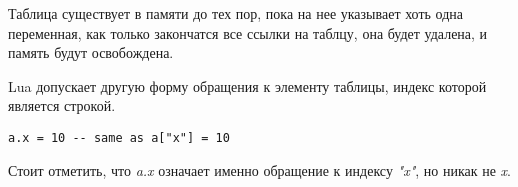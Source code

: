 Таблица существует в памяти до тех пор, пока на нее указывает хоть одна переменная, как только закончатся все ссылки на таблцу, она будет удалена, и память будут освобождена.

Lua допускает другую форму обращения к элементу таблицы, индекс которой является строкой. 

\begin{lstlisting}
a.x = 10 -- same as a["x"] = 10
\end{lstlisting}

Стоит отметить, что \emph{a.x} означает именно обращение к индексу \emph{"x"}, но никак не \emph{x}.

